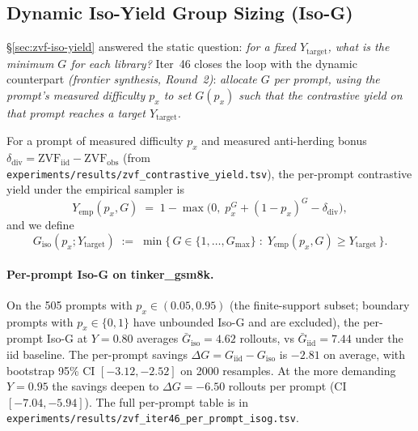
\subsection{Dynamic Iso-Yield Group Sizing (Iso-G)}
\label{sec:zvf-isog}
\S\ref{sec:zvf-iso-yield} answered the static question: \emph{for a
fixed $Y_{\mathrm{target}}$, what is the minimum $G$ for each library?}
Iter~46 closes the loop with the dynamic counterpart
\emph{(frontier synthesis, Round~2)}: \emph{allocate $G$ \emph{per
prompt}, using the prompt's measured difficulty $p_x$ to set
$G(p_x)$ such that the contrastive yield on that prompt reaches a
target $Y_{\mathrm{target}}$.}

For a prompt of measured difficulty $p_x$ and measured anti-herding
bonus $\delta_{\mathrm{div}} = \mathrm{ZVF}_{\mathrm{iid}} -
\mathrm{ZVF}_{\mathrm{obs}}$ (from
\texttt{experiments/results/zvf_contrastive_yield.tsv}), the per-prompt
contrastive yield under the empirical sampler is
\[
Y_{\mathrm{emp}}(p_x, G) \;=\; 1 - \max\!\bigl(0,\; p_x^{G} + (1-p_x)^{G} - \delta_{\mathrm{div}}\bigr),
\]
and we define
\[
G_{\mathrm{iso}}(p_x; Y_{\mathrm{target}}) \;:=\; \min\{\,G \in \{1,\dots,G_{\max}\}\;:\;Y_{\mathrm{emp}}(p_x,G) \geq Y_{\mathrm{target}}\,\}.
\]

\paragraph{Per-prompt Iso-G on tinker\_gsm8k.}
On the 505 prompts with $p_x \in (0.05, 0.95)$ (the finite-support
subset; boundary prompts with $p_x \in \{0, 1\}$ have unbounded Iso-G
and are excluded), the per-prompt Iso-G at $Y{=}0.80$ averages
$\bar G_{\mathrm{iso}}{=}4.62$ rollouts, vs $\bar G_{\mathrm{iid}}{=}7.44$
under the iid baseline. The per-prompt savings
$\Delta G = G_{\mathrm{iid}} - G_{\mathrm{iso}}$ is
$\mathbf{-2.81}$ on average, with bootstrap 95\% CI $[-3.12, -2.52]$
on 2000 resamples. At the more demanding $Y{=}0.95$ the savings
deepen to $\Delta G = -6.50$ rollouts per prompt (CI $[-7.04, -5.94]$).
The full per-prompt table is in
\texttt{experiments/results/zvf_iter46_per_prompt_isog.tsv}.

